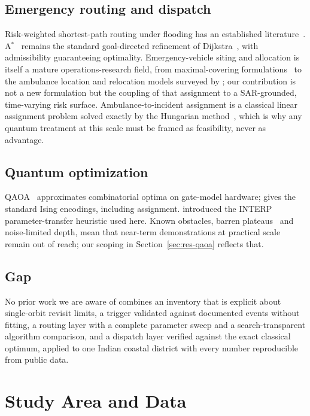 \documentclass[11pt,a4paper]{article}
\begin{document}
\subsection{Emergency routing and dispatch}
Risk-weighted shortest-path routing under flooding has an established
literature~\citep{zhang2019,yin2016}. A$^\ast$~\citep{hart1968} remains the
standard goal-directed refinement of Dijkstra~\citep{dijkstra1959}, with
admissibility guaranteeing optimality. Emergency-vehicle siting and allocation is
itself a mature operations-research field, from maximal-covering
formulations~\citep{church1974} to the ambulance location and relocation models
surveyed by \citet{brotcorne2003}; our contribution is not a new formulation but
the coupling of that assignment to a SAR-grounded, time-varying risk surface.
Ambulance-to-incident assignment is a classical linear assignment problem solved
exactly by the Hungarian method~\citep{kuhn1955}, which is why any quantum
treatment at this scale must be framed as feasibility, never as advantage.

\subsection{Quantum optimization}
QAOA~\citep{farhi2014} approximates combinatorial optima on gate-model hardware;
\citet{lucas2014} gives the standard Ising encodings, including assignment.
\citet{zhou2020} introduced the INTERP parameter-transfer heuristic used here.
Known obstacles, barren plateaus~\citep{mcclean2018} and noise-limited depth,
mean that near-term demonstrations at practical scale remain out of reach; our
scoping in Section~\ref{sec:res-qaoa} reflects that.

\subsection{Gap}
No prior work we are aware of combines an inventory that is explicit about
single-orbit revisit limits, a trigger validated against documented events
without fitting, a routing layer with a complete parameter sweep and a
search-transparent algorithm comparison, and a dispatch layer verified against
the exact classical optimum, applied to one Indian coastal district with every
number reproducible from public data.

\section{Study Area and Data}
\label{sec:study}
\end{document}

